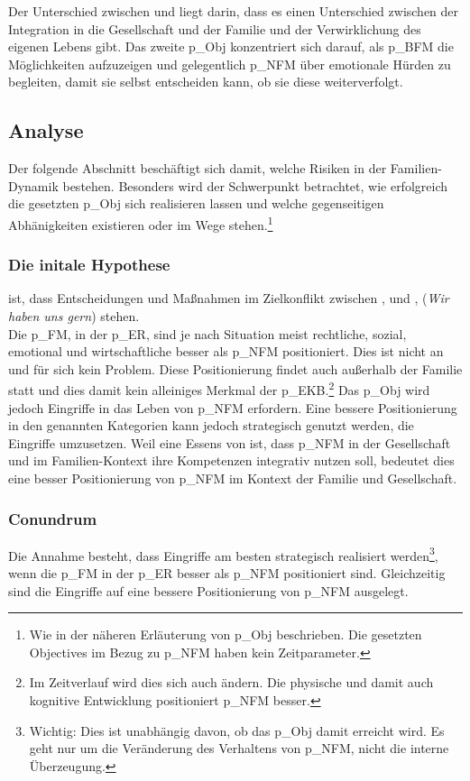 Der Unterschied zwischen \NFMOOne und \NFMOFour liegt darin, dass es einen Unterschied zwischen der Integration in die Gesellschaft und der Familie und der Verwirklichung des eigenen Lebens gibt. Das zweite \gls{p_Obj} konzentriert sich darauf, als \gls{p_BFM} die Möglichkeiten aufzuzeigen und gelegentlich \gls{p_NFM} über emotionale Hürden zu begleiten, damit sie selbst entscheiden kann, ob sie diese weiterverfolgt.

\subsection{Analyse} \label{sec:Risiko_EKB}
Der folgende Abschnitt beschäftigt sich damit, welche Risiken in der Familien-Dynamik bestehen. Besonders wird der Schwerpunkt betrachtet, wie erfolgreich die gesetzten \gls{p_Obj} sich realisieren lassen und welche gegenseitigen Abhänigkeiten existieren oder im Wege stehen.\footnote{
	Wie in der näheren Erläuterung von \gls{p_Obj} beschrieben. Die gesetzten Objectives im Bezug zu \gls{p_NFM} haben kein Zeitparameter.
}

\subsubsection{Die initale Hypothese} ist, dass Entscheidungen und Maßnahmen im Zielkonflikt zwischen \NFMOOne, \NFMOTwo und \NFMOThree, \NFMOFour (\textit{Wir haben uns gern}) stehen.\\


Die \gls{p_FM}, in der \gls{p_ER}, sind je nach Situation meist rechtliche, sozial, emotional und wirtschaftliche besser als \gls{p_NFM} positioniert. Dies ist nicht an und für sich kein Problem. Diese Positionierung findet auch außerhalb der Familie statt und dies damit kein alleiniges Merkmal der \gls{p_EKB}.\footnote{
	Im Zeitverlauf wird dies sich auch ändern. Die physische und damit auch kognitive Entwicklung positioniert \gls{p_NFM} besser.
}
Das \gls{p_Obj}  wird jedoch Eingriffe in das Leben von \gls{p_NFM} erfordern. Eine bessere Positionierung in den genannten Kategorien kann jedoch strategisch genutzt werden, die Eingriffe umzusetzen. Weil eine Essens von  ist, dass
\gls{p_NFM} in der Gesellschaft und im Familien-Kontext ihre Kompetenzen integrativ nutzen soll, bedeutet dies eine besser Positionierung von \gls{p_NFM} im Kontext der Familie und Gesellschaft.\\
 

\subsubsection{Conundrum} Die Annahme besteht, dass Eingriffe am besten strategisch realisiert werden\footnote{
	Wichtig: Dies ist unabhängig davon, ob das \gls{p_Obj} damit erreicht wird. Es geht nur um die Veränderung des Verhaltens von \gls{p_NFM}, nicht die interne Überzeugung.
}, wenn die \gls{p_FM} in der \gls{p_ER} besser als \gls{p_NFM} positioniert sind. Gleichzeitig sind die Eingriffe auf eine bessere Positionierung von \gls{p_NFM} ausgelegt.\\


